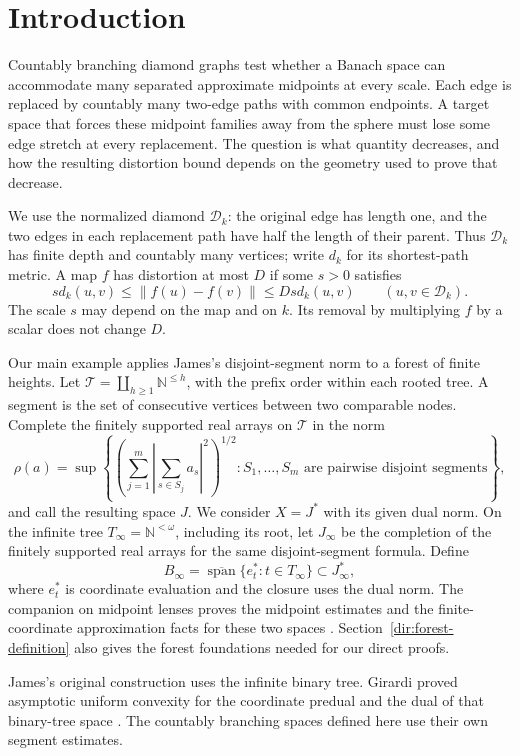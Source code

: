 \section{Introduction}\label{met:introduction}
Countably branching diamond graphs test whether a Banach space can
accommodate many separated approximate midpoints at every scale. Each
edge is replaced by countably many two-edge paths with common endpoints.
A target space that forces these midpoint families away from the sphere
must lose some edge stretch at every replacement. The question is what
quantity decreases, and how the resulting distortion bound depends on
the geometry used to prove that decrease.

We use the normalized diamond $\mathcal D_k$: the original edge has
length one, and the two edges in each replacement path have half the
length of their parent. Thus $\mathcal D_k$ has finite depth and
countably many vertices; write $d_k$ for its shortest-path metric. A map $f$ has distortion at most $D$ if some
$s>0$ satisfies
\[
 s d_k(u,v)\le\|f(u)-f(v)\|\le Ds d_k(u,v)
 \qquad(u,v\in\mathcal D_k).
\]
The scale $s$ may depend on the map and on $k$. Its removal by
multiplying $f$ by a scalar does not change $D$.

Our main example applies James's disjoint-segment norm
\cite[p.~739]{James1974} to a forest of finite heights. Let
$\mathcal T=\coprod_{h\ge1}\mathbb N^{\le h}$, with the prefix order
within each rooted tree. A segment is the set of consecutive vertices
between two comparable nodes. Complete the finitely supported real
arrays on $\mathcal T$ in the norm
\[
 \rho(a)=\sup\left\{
  \left(\sum_{j=1}^m\left|\sum_{s\in S_j}a_s\right|^2\right)^{1/2}:
  S_1,\ldots,S_m\text{ are pairwise disjoint segments}\right\},
\]
and call the resulting space $J$. We consider $X=J^*$ with its given
dual norm. On the infinite tree $T_\infty=\mathbb N^{<\omega}$,
including its root, let $J_\infty$ be the completion of the finitely
supported real arrays for the same disjoint-segment formula. Define
\[
 B_\infty=\overline{\operatorname{span}}\{e_t^*:t\in T_\infty\}
 \subset J_\infty^*,
\]
where $e_t^*$ is coordinate evaluation and the closure uses the dual
norm. The companion on midpoint lenses proves the midpoint estimates
and the finite-coordinate approximation facts for these two spaces
\cite{SegmentLenses}. Section~\ref{dir:forest-definition} also gives
the forest foundations needed for our direct proofs.

James's original construction uses the infinite binary tree.
Girardi proved asymptotic uniform convexity for the coordinate predual
and the dual of that binary-tree space
\cite[Theorems~3 and~5]{Girardi2001}. The countably branching spaces
defined here use their own segment estimates.


